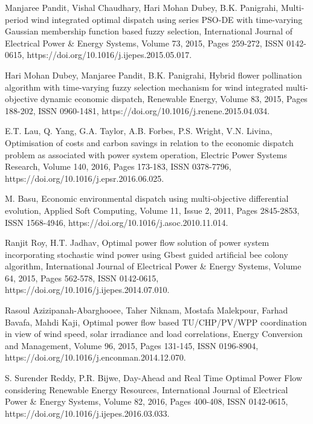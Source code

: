 \begin{thebibliography}{99}
\begin{singlespace}
Manjaree Pandit, Vishal Chaudhary, Hari Mohan Dubey, B.K. Panigrahi, Multi-period wind integrated optimal dispatch using series PSO-DE with time-varying Gaussian membership function based fuzzy selection, International Journal of Electrical Power \& Energy Systems, Volume 73, 2015, Pages 259-272, ISSN 0142-0615, https://doi.org/10.1016/j.ijepes.2015.05.017.

 Hari Mohan Dubey, Manjaree Pandit, B.K. Panigrahi, Hybrid flower pollination algorithm with time-varying fuzzy selection mechanism for wind integrated multi-objective dynamic economic dispatch, Renewable Energy, Volume 83, 2015, Pages 188-202, ISSN 0960-1481, https://doi.org/10.1016/j.renene.2015.04.034.

E.T. Lau, Q. Yang, G.A. Taylor, A.B. Forbes, P.S. Wright, V.N. Livina, Optimisation of costs and carbon savings in relation to the economic dispatch problem as associated with power system operation, Electric Power Systems Research, Volume 140, 2016, Pages 173-183, ISSN 0378-7796, https://doi.org/10.1016/j.epsr.2016.06.025.

 M. Basu, Economic environmental dispatch using multi-objective differential evolution, Applied Soft Computing, Volume 11, Issue 2, 2011, Pages 2845-2853, ISSN 1568-4946, https://doi.org/10.1016/j.asoc.2010.11.014. 


 Ranjit Roy, H.T. Jadhav, Optimal power flow solution of power system incorporating stochastic wind power using Gbest guided artificial bee colony algorithm, International Journal of Electrical Power \& Energy Systems, Volume 64, 2015, Pages 562-578, ISSN 0142-0615, https://doi.org/10.1016/j.ijepes.2014.07.010. 

 Rasoul Azizipanah-Abarghooee, Taher Niknam, Mostafa Malekpour, Farhad Bavafa, Mahdi Kaji, Optimal power flow based TU/CHP/PV/WPP coordination in view of wind speed, solar irradiance and load  correlations, Energy Conversion and Management, Volume 96, 2015, Pages 131-145, ISSN 0196-8904, https://doi.org/10.1016/j.enconman.2014.12.070.

 S. Surender Reddy, P.R. Bijwe, Day-Ahead and Real Time Optimal Power Flow considering Renewable Energy Resources, International Journal of Electrical Power \& Energy Systems, Volume 82, 2016, Pages 400-408, ISSN 0142-0615, https://doi.org/10.1016/j.ijepes.2016.03.033.


\end{singlespace}
\end{thebibliography}
